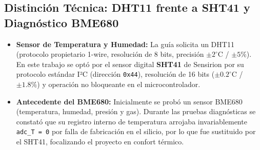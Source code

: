 \subsection{Distinción Técnica: DHT11 frente a SHT41 y Diagnóstico BME680}
\begin{itemize}
    \item \practicaBadge \textbf{Sensor de Temperatura y Humedad:} La guía solicita un DHT11 (protocolo propietario 1-wire, resolución de 8 bits, precisión $\pm 2^\circ\text{C}$ / $\pm 5\%$). En este trabajo se optó por el sensor digital \textbf{SHT41} de Sensirion por su protocolo estándar I²C (dirección \texttt{0x44}), resolución de 16 bits ($\pm 0.2^\circ\text{C}$ / $\pm 1.8\%$) y operación no bloqueante en el microcontrolador.
    \item \proyectoBadge \textbf{Antecedente del BME680:} Inicialmente se probó un sensor BME680 (temperatura, humedad, presión y gas). Durante las pruebas diagnósticas se constató que su registro interno de temperatura arrojaba invariablemente \texttt{adc\_T = 0} por falla de fabricación en el silicio, por lo que fue sustituido por el SHT41, focalizando el proyecto en confort térmico.
\end{itemize}
